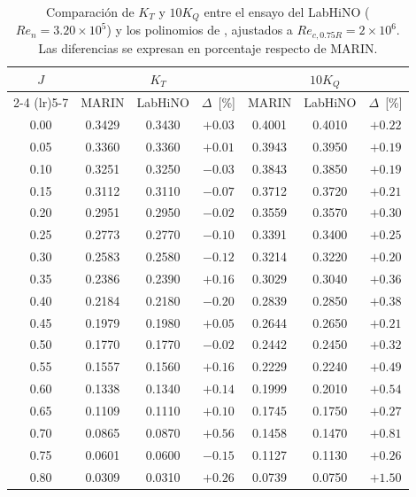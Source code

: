 \begin{table}[htpb]
\centering
\caption{Comparación de $K_T$ y $10K_Q$ entre el ensayo del LabHiNO ($Re_n = 3.20\times10^5$) y los polinomios de \citet{oosterveld1975}, ajustados a $Re_{c,0.75R} = 2 \times 10^6$. Las diferencias se expresan en porcentaje respecto de MARIN.}
\label{tab:comparacion_efd_marin}
\small
\begin{tabular}{ccccccc}
\hline
\multirow{2}{*}{$J$} & \multicolumn{3}{c}{$K_T$} & \multicolumn{3}{c}{$10K_Q$} \\
\cmidrule(lr){2-4} \cmidrule(lr){5-7}
 & MARIN & LabHiNO & $\Delta$~[\%] & MARIN & LabHiNO & $\Delta$~[\%] \\
\hline
    0.00 & 0.3429 & 0.3430 & $+0.03$ & 0.4001 & 0.4010 & $+0.22$ \\
    0.05 & 0.3360 & 0.3360 & $+0.01$ & 0.3943 & 0.3950 & $+0.19$ \\
    0.10 & 0.3251 & 0.3250 & $-0.03$ & 0.3843 & 0.3850 & $+0.19$ \\
    0.15 & 0.3112 & 0.3110 & $-0.07$ & 0.3712 & 0.3720 & $+0.21$ \\
    0.20 & 0.2951 & 0.2950 & $-0.02$ & 0.3559 & 0.3570 & $+0.30$ \\
    0.25 & 0.2773 & 0.2770 & $-0.10$ & 0.3391 & 0.3400 & $+0.25$ \\
    0.30 & 0.2583 & 0.2580 & $-0.12$ & 0.3214 & 0.3220 & $+0.20$ \\
    0.35 & 0.2386 & 0.2390 & $+0.16$ & 0.3029 & 0.3040 & $+0.36$ \\
    0.40 & 0.2184 & 0.2180 & $-0.20$ & 0.2839 & 0.2850 & $+0.38$ \\
    0.45 & 0.1979 & 0.1980 & $+0.05$ & 0.2644 & 0.2650 & $+0.21$ \\
    0.50 & 0.1770 & 0.1770 & $-0.02$ & 0.2442 & 0.2450 & $+0.32$ \\
    0.55 & 0.1557 & 0.1560 & $+0.16$ & 0.2229 & 0.2240 & $+0.49$ \\
    0.60 & 0.1338 & 0.1340 & $+0.14$ & 0.1999 & 0.2010 & $+0.54$ \\
    0.65 & 0.1109 & 0.1110 & $+0.10$ & 0.1745 & 0.1750 & $+0.27$ \\
    0.70 & 0.0865 & 0.0870 & $+0.56$ & 0.1458 & 0.1470 & $+0.81$ \\
    0.75 & 0.0601 & 0.0600 & $-0.15$ & 0.1127 & 0.1130 & $+0.26$ \\
    0.80 & 0.0309 & 0.0310 & $+0.26$ & 0.0739 & 0.0750 & $+1.50$ \\
\hline
\end{tabular}
\end{table}

